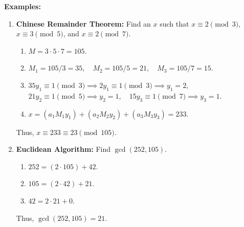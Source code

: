 \documentclass[notitlepage]{report}
\begin{document}
  \textbf{Examples:}
  \begin{enumerate}
    \item \textbf{Chinese Remainder Theorem:} Find an $x$ such that $x \equiv 2 \pmod{3}$, $x \equiv 3 \pmod{5}$, and $x \equiv 2 \pmod{7}$.
      \begin{enumerate}
        \item $M = 3 \cdot 5 \cdot 7 = 105$.
        \item  $M_1 = 105/3 = 35, \quad M_2 = 105/5 = 21, \quad M_3 = 105/7 = 15$.
        \item $35y_1 \equiv 1 \pmod{3} \implies 2y_1 \equiv 1 \pmod{3} \implies y_1 = 2$, $21y_2 \equiv 1 \pmod{5} \implies y_2 = 1, \quad 15y_3 \equiv 1 \pmod{7} \implies y_3 = 1$.
        \item $x = (a_1M_1y_1) + (a_2M_2y_2) + (a_3M_3y_3) = 233$.
      \end{enumerate}
      Thus, $x \equiv 233 \equiv 23 \pmod{105}$.
    \item \textbf{Euclidean Algorithm:} Find $\gcd(252, 105)$.
      \begin{enumerate}
        \item $252 = (2 \cdot 105) + 42$.
        \item $105 = (2 \cdot 42) + 21$.
        \item $42 = 2 \cdot 21 + 0$.
      \end{enumerate}
      Thus, $\gcd(252, 105) = 21$.
  \end{enumerate}






\end{document}

